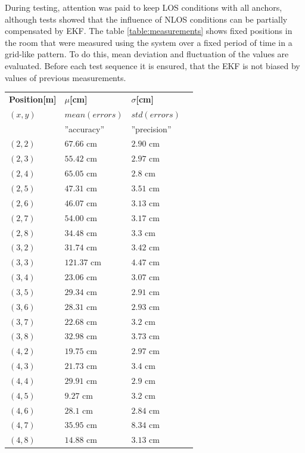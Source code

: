 \documentclass[final, conference, a4paper]{IEEEtran}
\begin{document}
During testing, attention was paid to keep \ac{LOS} conditions with all anchors,
although tests showed that the influence of \ac{NLOS} conditions can be partially compensated by \ac{EKF}.
The table \ref{table:measurements} shows fixed positions in the room that were measured using the system
over a fixed period of time in a grid-like pattern. 
To do this, mean deviation and fluctuation of the values are evaluated. 
Before each test sequence it is ensured, that the \ac{EKF} is not biased by values of previous measurements. 

\begin{table}[hbt!]
	\centering
	\begin{tabular}{l l l c}
		\textbf{Position[m]} & \textbf{$\mu$[cm]} & \textbf{$\sigma$[cm]}\\
		$(x,y)$ & $mean(errors)$ & $std(errors)$\\
		& ''accuracy'' & ''precision''\\
		$(2,2)$ & $67.66$ cm & $2.90$ cm\\
		$(2,3)$ & $55.42$ cm & $2.97$ cm\\
		$(2,4)$ & $65.05$ cm & $2.8$ cm\\
		$(2,5)$ & $47.31$ cm & $3.51$ cm\\
		$(2,6)$ & $46.07$ cm & $3.13$ cm\\
		$(2,7)$ & $54.00$ cm & $3.17$ cm\\
		$(2,8)$ & $34.48$ cm & $3.3$ cm\\

		$(3,2)$ & $31.74$ cm & $3.42$ cm\\
		$(3,3)$ & $121.37$ cm & $4.47$ cm\\
		$(3,4)$ & $23.06$ cm & $3.07$ cm\\
		$(3,5)$ & $29.34$ cm & $2.91$ cm\\
		$(3,6)$ & $28.31$ cm & $2.93$ cm\\
		$(3,7)$ & $22.68$ cm & $3.2$ cm\\
		$(3,8)$ & $32.98$ cm & $3.73$ cm\\

		$(4,2)$ & $19.75$ cm & $2.97$ cm\\
		$(4,3)$ & $21.73$ cm & $3.4$ cm\\
		$(4,4)$ & $29.91$ cm & $2.9$ cm\\
		$(4,5)$ & $9.27$ cm & $3.2$ cm\\
		$(4,6)$ & $28.1$ cm & $2.84$ cm\\
		$(4,7)$ & $35.95$ cm & $8.34$ cm\\
		$(4,8)$ & $14.88$ cm & $3.13$ cm\\


\end{tabular}
\end{table}
\end{document}
